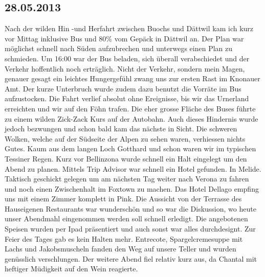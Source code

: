 \subsection{28.05.2013}
Nach der wilden Hin -und Herfahrt zwischen Buochs und Dättwil kam ich kurz vor Mittag inklusive Bus und 80\% vom Gepäck in Dättwil an.
Der Plan war möglichst schnell nach Süden aufzubrechen und unterwegs einen Plan zu schmieden.
Um 16:00 war der Bus beladen, sich überall verabschiedet und der Verkehr hoffentlich noch erträglich.
Nicht der Verkehr, sondern mein Magen, genauer gesagt ein leichtes Hungergefühl zwang uns zur ersten Rast im Knonauer Amt.
Der kurze Unterbruch wurde zudem dazu benutzt die Vorräte im Bus aufzustocken.
Die Fahrt verlief absolut ohne Ereignisse, bis wir das Urnerland erreichten und wir auf den Föhn trafen.
Die eher grosse Fläche des Buses führte zu einem wilden Zick-Zack Kurs auf der Autobahn.
Auch dieses Hindernis wurde jedoch bezwungen und schon bald kam das nächste in Sicht.
Die schweren Wolken, welche auf der Südseite der Alpen zu sehen waren, verhiessen nichts Gutes.
Kaum aus dem langen Loch Gotthard und schon waren wir im typischen Tessiner Regen.
Kurz vor Bellinzona wurde schnell ein Halt eingelegt um den Abend zu planen.
Mittels Trip Advisor war schnell ein Hotel gefunden.
In Melide.
Taktisch geschickt gelegen um am nächsten Tag weiter nach Verona zu fahren und noch einen Zwischenhalt im Foxtown zu machen.
Das Hotel Dellago empfing uns mit einem Zimmer komplett in Pink.
Die Aussicht von der Terrasse des Hauseigenen Restaurants war wunderschön und so war die Diskussion, wo heute unser Abendmahl eingenommen werden soll schnell erledigt.
Die angebotenen Speisen wurden per Ipad präsentiert und auch sonst war alles durchdesignt.
Zur Feier des Tages gab es kein Halten mehr.
Entrecote, Spargelcremesuppe mit Lachs und Jakobsmuscheln fanden den Weg auf unsere Teller und wurden genüsslich verschlungen.
Der weitere Abend fiel relativ kurz aus, da Chantal mit heftiger Müdigkeit auf den Wein reagierte.

